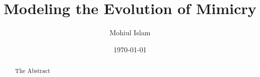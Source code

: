 \documentclass[11pt,oneside,letterpaper]{report}
\numberwithin{equation}{section}
\numberwithin{algorithm}{chapter}
\begin{document}
\title{Modeling the Evolution of Mimicry}
\author{Mohiul Islam}
\date{\today}


\maketitle

\begin{abstract}
The Abstract
\end{abstract}

\tableofcontents
\listoffigures
\listoftables



%






\renewcommand{\bibname}{ References}


\end{document}
